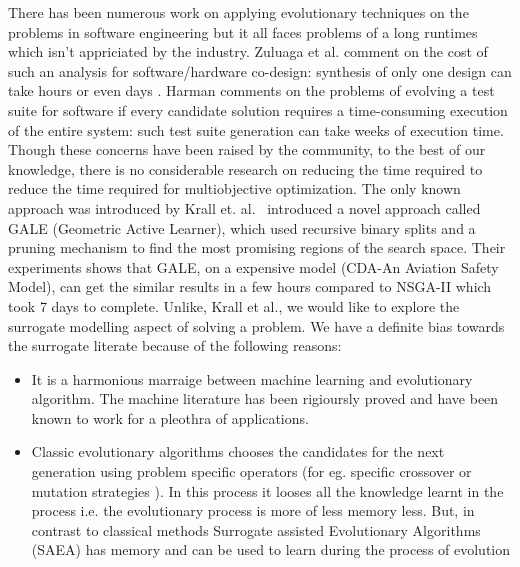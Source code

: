 \documentclass{newsig}
\begin{document}
There has been numerous work on applying evolutionary techniques on the problems in software engineering but it all faces problems of a long runtimes which isn't appriciated by the industry. Zuluaga et al. \cite{zuluaga2013active} comment on the cost of such an analysis for
software/hardware co-design: \textquotedbl synthesis of only one
design can take hours or even days \textquotedbl. Harman \cite{harman2012search} comments
on the problems of evolving a test suite for software
if every candidate solution requires a time-consuming
execution of the entire system: such test suite generation
can take weeks of execution time. Though these concerns have been raised by the community, to the best of our knowledge, there is no considerable research on reducing the time required to reduce the time required for multiobjective optimization. The only known approach was introduced by Krall et. al.~\cite{krall2014gale}  introduced a novel approach called GALE (Geometric Active Learner), which used recursive binary splits and a pruning mechanism to find the most promising regions of the search space. Their experiments shows that GALE, on a expensive model (CDA-An Aviation Safety Model), can get the similar results in a few hours compared to NSGA-II which took 7 days to complete. Unlike, Krall et al., we would like to explore the surrogate modelling aspect of solving a problem. We have a definite bias towards the surrogate literate because of the following reasons:
\begin{itemize}
\item{It is a harmonious marraige between machine learning and evolutionary algorithm. The machine literature has been rigioursly proved and have been known to work for a pleothra of applications.}
\item{Classic evolutionary algorithms chooses the candidates for the next generation using problem specific operators (for eg. specific crossover or mutation strategies \cite{koziolek2011peropteryx}). In this process it looses all the knowledge learnt in the process i.e. the evolutionary process is more of less memory less. But, in contrast to classical methods Surrogate assisted Evolutionary Algorithms (SAEA) has memory and can be used to learn during the process of evolution}
\end{itemize}
\end{document}
